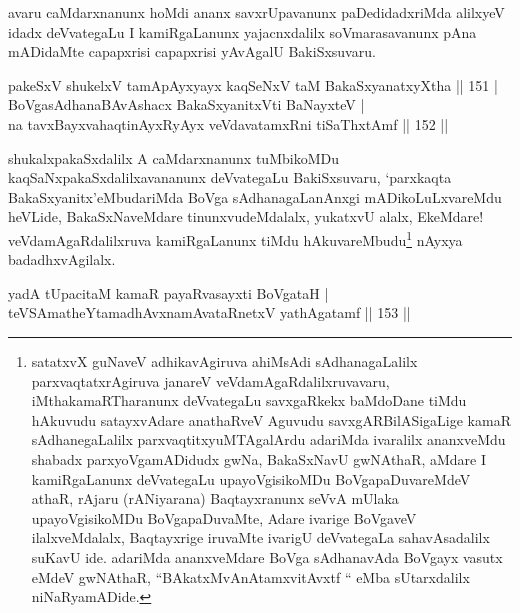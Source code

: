 \begin{artha}
avaru caMdarxnanunx hoMdi ananx savxrUpavanunx paDedidadxriMda
alilxyeV idadx deVvategaLu I kamiRgaLanunx yajacnxdalilx
soVmarasavanunx pAna mADidaMte capapxrisi capapxrisi yAvAgalU
BakiSxsuvaru.
\end{artha}

\begin{shl}
pakeSxV shukelxV tamApAyxyayx kaqSeNxV taM BakaSxyanatxyXtha \hfill|| 151 | \\
BoVgasAdhanaBAvAshacx BakaSxyanitxVti BaNayxteV | \\
na tavxBayxvahaqtinAyxRyAyx veVdavatamxRni tiSaThxtAmf \hfill|| 152 || 
\end{shl}

\begin{artha}
shukalxpakaSxdalilx A caMdarxnanunx tuMbikoMDu kaqSaNxpakaSxdalilxavananunx deVvategaLu BakiSxsuvaru, `parxkaqta BakaSxyanitx'eMbudariMda BoVga sAdhanagaLanAnxgi mADikoLuLxvareMdu heVLide, BakaSxNaveMdare tinunxvudeMdalalx, yukatxvU alalx, EkeMdare! veVdamAgaRdalilxruva kamiRgaLanunx tiMdu hAkuvareMbudu\footnote[1]{satatxvX guNaveV adhikavAgiruva ahiMsAdi sAdhanagaLalilx parxvaqtatxrAgiruva  janareV veVdamAgaRdalilxruvavaru, iMthakamaRTharanunx deVvategaLu  savxgaRkekx baMdoDane tiMdu hAkuvudu satayxvAdare anathaRveV Aguvudu  savxgARBilASigaLige kamaR sAdhanegaLalilx parxvaqtitxyuMTAgalArdu  adariMda ivaralilx ananxveMdu shabadx parxyoVgamADidudx gwNa,  BakaSxNavU gwNAthaR, aMdare I kamiRgaLanunx deVvategaLu  upayoVgisikoMDu BoVgapaDuvareMdeV athaR, rAjaru (rANiyarana)  Baqtayxranunx seVvA mUlaka upayoVgisikoMDu BoVgapaDuvaMte, Adare  ivarige BoVgaveV ilalxveMdalalx, Baqtayxrige iruvaMte ivarigU  deVvategaLa sahavAsadalilx suKavU ide. adariMda ananxveMdare BoVga  sAdhanavAda BoVgayx vasutx eMdeV gwNAthaR, ``BAkatxMvA\s  nAtamxvitAvxtf `` eMba sUtarxdalilx niNaRyamADide.} nAyxya badadhxvAgilalx.
\end{artha}


\begin{shl}
yadA tUpacitaM kamaR payaRvasayxti BoVgataH | \\
teVSAmatheYtamadhAvxnamAvataRnetxV yathAgatamf \hfill|| 153 || 
\end{shl}

